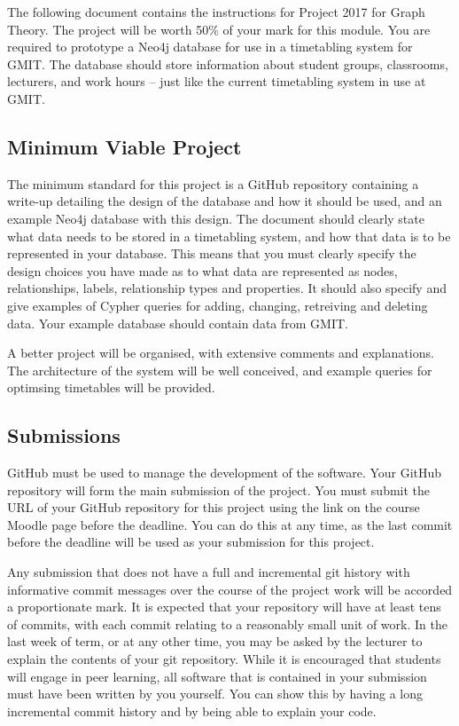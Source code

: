 \documentclass[12pt, a4paper]{article}
\title{\projectname}
\author{\modulename}
\date{Due: \duedate}
\newcommand{\modulename}{Graph Theory}
\newcommand{\projectyear}{2017}
\newcommand{\projectname}{Project \projectyear}
\begin{document}
\maketitle

\noindent
The following document contains the instructions for \projectname{} for \modulename{}.
The project will be worth 50\% of your mark for this module.
You are required to prototype a Neo4j database for use in a timetabling system for GMIT.
The database should store information about student groups, classrooms, lecturers, and work hours -- just like the current timetabling system in use at GMIT.

\subsection*{Minimum Viable Project}
The minimum standard for this project is a GitHub repository containing a write-up detailing the design of the database and how it should be used, and an example Neo4j database with this design.
The document should clearly state what data needs to be stored in a timetabling system, and how that data is to be represented in your database.
This means that you must clearly specify the design choices you have made as to what data are represented as nodes, relationships, labels, relationship types and properties.
It should also specify and give examples of Cypher queries for adding, changing, retreiving and deleting data.
Your example database should contain data from GMIT.

A better project will be organised, with extensive comments and explanations.
The architecture of the system will be well conceived, and example queries for optimsing timetables will be provided.


\subsection*{Submissions}
GitHub must be used to manage the development of the software.
Your GitHub repository will form the main submission of the project.
You must submit the URL of your GitHub repository for this project using the link on the course Moodle page before the deadline.
You can do this at any time, as the last commit before the deadline will be used as your submission for this project.

Any submission that does not have a full and incremental git history with informative commit messages over the course of the project work will be accorded a proportionate mark.
It is expected that your repository will have at least tens of commits, with each commit relating to a reasonably small unit of work.
In the last week of term, or at any other time, you may be asked by the lecturer to explain the contents of your git repository.
While it is encouraged that students will engage in peer learning, all software that is contained in your submission must have been written by you yourself.
You can show this by having a long incremental commit history and by being able to explain your code.
\end{document}
